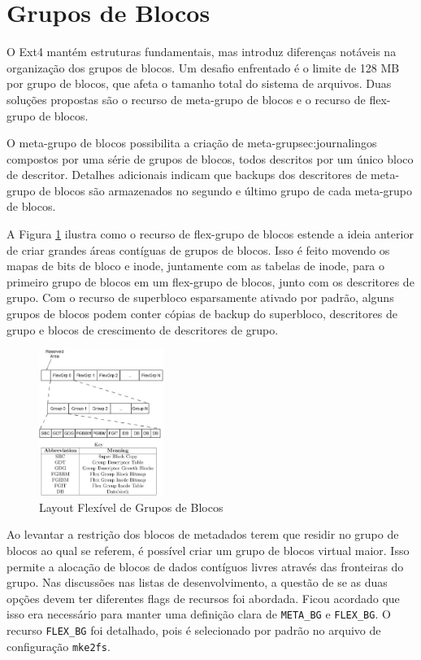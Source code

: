 \documentclass[
	12pt,				%
	openright,			%
	oneside,			%
	a4paper,			%
	chapter=TITLE,		%
	english,			%
	french,				%
	spanish,			%
	brazil				%
	]{abntex2}
\theoremstyle{definition}
\begin{document}
\section{Grupos de Blocos}
O Ext4 mantém estruturas fundamentais, mas introduz diferenças notáveis na organização dos grupos 
de blocos. Um desafio enfrentado é o limite de 128 MB por grupo de blocos, que afeta o tamanho total 
do sistema de arquivos. Duas soluções propostas são o recurso de meta-grupo de blocos e o recurso de 
flex-grupo de blocos.

O meta-grupo de blocos possibilita a criação de meta-grup{sec:journaling}os compostos por uma série de grupos de 
blocos, todos descritos por um único bloco de descritor. Detalhes adicionais indicam que backups 
dos descritores de meta-grupo de blocos são armazenados no segundo e último grupo de cada meta-grupo de blocos.

A Figura \ref{fig:9} ilustra como o recurso de flex-grupo de blocos estende a ideia anterior 
de criar grandes áreas contíguas de grupos de blocos. Isso é feito movendo os mapas de bits de bloco e 
inode, juntamente com as tabelas de inode, para o primeiro grupo de blocos em um flex-grupo de blocos, 
junto com os descritores de grupo. Com o recurso de superbloco esparsamente ativado por padrão, alguns
grupos de blocos podem conter cópias de backup do superbloco, descritores de grupo e blocos de 
crescimento de descritores de grupo.

\begin{figure}[H]
	\centering
	\includegraphics[width=0.36\textwidth]{fig9.jpg}
	\caption{Layout Flexível de Grupos de Blocos}
	\label{fig:9}
\end{figure}

Ao levantar a restrição dos blocos de metadados terem q\cite{carrier2005file}ue residir no grupo de blocos ao qual se 
referem, é possível criar um grupo de blocos virtual maior. Isso permite a alocação de blocos de
dados contíguos livres através das fronteiras do grupo. Nas discussões nas listas de desenvolvimento, 
a questão de se as duas opções devem ter diferentes flags de recursos foi abordada. Ficou acordado 
que isso era necessário para manter uma definição clara de \texttt{META\_BG} e \texttt{FLEX\_BG}. 
O recurso \texttt{FLEX\_BG} foi detalhado, pois é selecionado por padrão no arquivo de configuração \texttt{mke2fs}.
\end{document}

